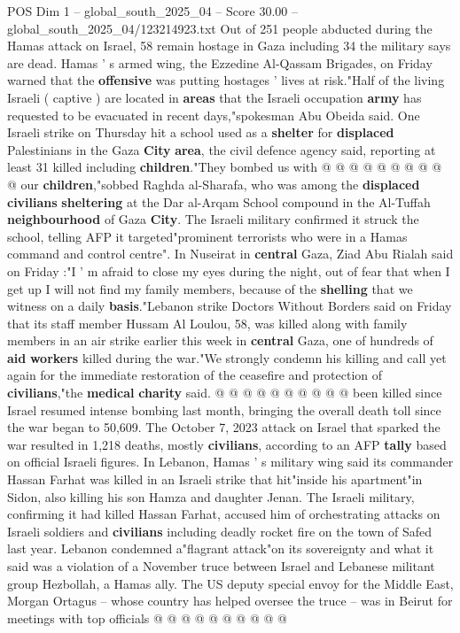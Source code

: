 \begin{textsample}{POS Dim 1 – global\_south\_2025\_04 – Score 30.00 – global\_south\_2025\_04/123214923.txt}
Out of 251 people abducted during the Hamas attack on Israel, 58 remain hostage in Gaza including 34 the military says are dead.
Hamas ' s armed wing, the Ezzedine Al-Qassam Brigades, on Friday warned that the \textbf{offensive} was putting hostages ' lives at risk."Half of the living Israeli ( captive ) are located in \textbf{areas} that the Israeli occupation \textbf{army} has requested to be evacuated in recent days,"spokesman Abu Obeida said.
One Israeli strike on Thursday hit a school used as a \textbf{shelter} for \textbf{displaced} Palestinians in the Gaza \textbf{City} \textbf{area}, the civil defence agency said, reporting at least 31 killed including \textbf{children}."They bombed us with @ @ @ @ @ @ @ @ @ @ our \textbf{children},"sobbed Raghda al-Sharafa, who was among the \textbf{displaced} \textbf{civilians} \textbf{sheltering} at the Dar al-Arqam School compound in the Al-Tuffah \textbf{neighbourhood} of Gaza \textbf{City}.
The Israeli military confirmed it struck the school, telling AFP it targeted"prominent terrorists who were in a Hamas command and control centre".
In Nuseirat in \textbf{central} Gaza, Ziad Abu Rialah said on Friday :"I ' m afraid to close my eyes during the night, out of fear that when I get up I will not find my family members, because of the \textbf{shelling} that we witness on a daily \textbf{basis}."Lebanon strike Doctors Without Borders said on Friday that its staff member Hussam Al Loulou, 58, was killed along with family members in an air strike earlier this week in \textbf{central} Gaza, one of hundreds of \textbf{aid} \textbf{workers} killed during the war."We strongly condemn his killing and call yet again for the immediate restoration of the ceasefire and protection of \textbf{civilians},"the \textbf{medical} \textbf{charity} said. @ @ @ @ @ @ @ @ @ @ been killed since Israel resumed intense bombing last month, bringing the overall death toll since the war began to 50,609.
The October 7, 2023 attack on Israel that sparked the war resulted in 1,218 deaths, mostly \textbf{civilians}, according to an AFP \textbf{tally} based on official Israeli figures.
In Lebanon, Hamas ' s military wing said its commander Hassan Farhat was killed in an Israeli strike that hit"inside his apartment"in Sidon, also killing his son Hamza and daughter Jenan.
The Israeli military, confirming it had killed Hassan Farhat, accused him of orchestrating attacks on Israeli soldiers and \textbf{civilians} including deadly rocket fire on the town of Safed last year.
Lebanon condemned a"flagrant attack"on its sovereignty and what it said was a violation of a November truce between Israel and Lebanese militant group Hezbollah, a Hamas ally.
The US deputy special envoy for the Middle East, Morgan Ortagus -- whose country has helped oversee the truce -- was in Beirut for meetings with top officials @ @ @ @ @ @ @ @ @ @

\end{textsample}
